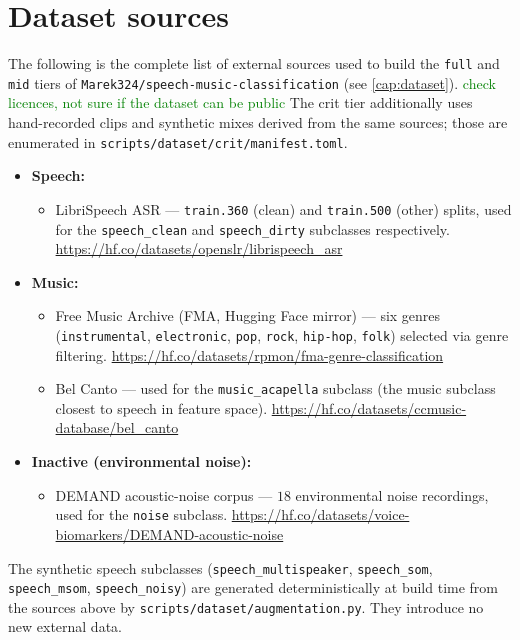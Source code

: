 \chapter{Dataset sources}
\label{apx:dataset_sources}
The following is the complete list of external sources used to build the \texttt{full} and \texttt{mid} tiers of \texttt{Marek324/speech-music-classification} (see \cref{cap:dataset}). \textcolor{green}{check licences, not sure if the dataset can be public}
The crit tier additionally uses hand-recorded clips and synthetic mixes derived from the same sources; those are enumerated in \texttt{scripts/dataset/crit/manifest.toml}.

\begin{itemize}
    \item \textbf{Speech:}
    \begin{itemize}
        \item LibriSpeech ASR --- \texttt{train.360} (clean) and \texttt{train.500} (other) splits, used for the \texttt{speech\_clean} and \texttt{speech\_dirty} subclasses respectively. \url{https://hf.co/datasets/openslr/librispeech_asr}
    \end{itemize}

    \item \textbf{Music:}
    \begin{itemize}
        \item Free Music Archive (FMA, Hugging Face mirror) --- six genres (\texttt{instrumental}, \texttt{electronic}, \texttt{pop}, \texttt{rock}, \texttt{hip-hop}, \texttt{folk}) selected via genre filtering. \url{https://hf.co/datasets/rpmon/fma-genre-classification}
        \item Bel Canto --- used for the \texttt{music\_acapella} subclass (the music subclass closest to speech in feature space). \url{https://hf.co/datasets/ccmusic-database/bel_canto}
    \end{itemize}

    \item \textbf{Inactive (environmental noise):}
    \begin{itemize}
        \item DEMAND acoustic-noise corpus --- $18$ environmental noise recordings, used for the \texttt{noise} subclass. \url{https://hf.co/datasets/voice-biomarkers/DEMAND-acoustic-noise}
    \end{itemize}
\end{itemize}

The synthetic speech subclasses (\texttt{speech\_multispeaker}, \texttt{speech\_som}, \texttt{speech\_msom}, \texttt{speech\_noisy}) are generated deterministically at build time from the sources above by \texttt{scripts/dataset/augmentation.py}.
They introduce no new external data.

